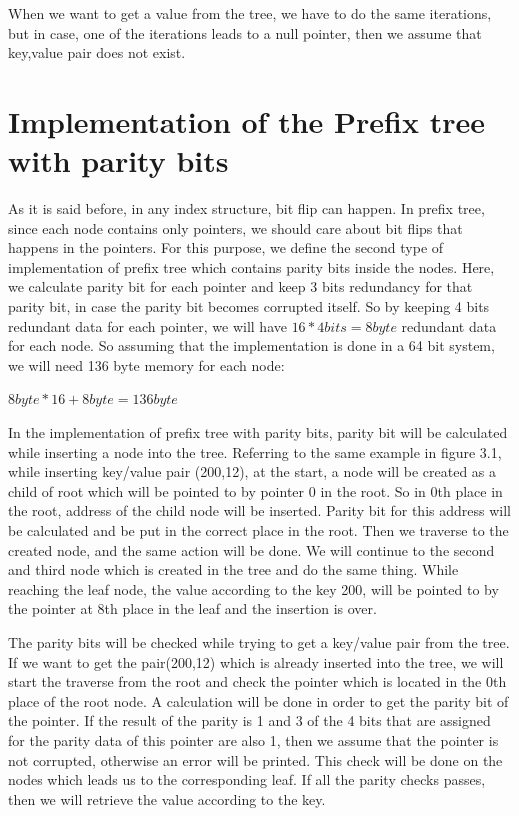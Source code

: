 \documentclass[12pt]{report}
\begin{document}
When we want to get a value from the tree, we have to do the same iterations, but in case, one of the iterations leads to a null pointer, then we assume that key,value pair does not exist. 

\section{Implementation of the Prefix tree with parity bits}

As it is said before, in any index structure, bit flip can happen. In prefix tree, since each node contains only pointers, we should care about bit flips that happens in the pointers. For this purpose, we define the second type of implementation of prefix tree which contains parity bits inside the nodes. Here, we calculate parity bit for each pointer and keep 3 bits redundancy for that parity bit, in case the parity bit becomes corrupted itself. So by keeping 4 bits redundant data for each pointer, we will have $16*4 bits=8 byte$ redundant data for each node. So assuming that the implementation is done in a 64 bit system, we will need 136 byte memory for each node:


$8byte*16+8byte=136 byte$    

In the implementation of prefix tree with parity bits, parity bit will be calculated  while inserting a node into the tree. Referring to the same example in figure 3.1, while inserting key/value pair (200,12), at the start, a node will be created as a child of root which will be pointed to by pointer 0 in the root. So in 0th place in the root, address of the child node will be inserted. Parity bit for this address will be calculated and be put in the correct place in the root. Then we traverse to the created node, and the same action will be done. We will continue to the second and third node which is created in the tree and do the same thing. While reaching the leaf node, the value according to the key 200, will be pointed to by the pointer at 8th place in the leaf and the insertion is over.

The parity bits will be checked while trying to get a key/value pair from the tree. If we want to get the pair(200,12) which is already inserted into the tree, we will start the traverse from the root and check the pointer which is located in the 0th place of the root node. A calculation will be done in order to get the parity bit of the pointer. If the result of the parity is 1 and 3 of the 4 bits that are assigned for the parity data of this pointer are also 1, then we assume that the pointer is not corrupted, otherwise an error will be printed. This check will be done on the nodes which leads us to the corresponding leaf. If all the parity checks passes, then we will retrieve the value according to the key.
\end{document}
